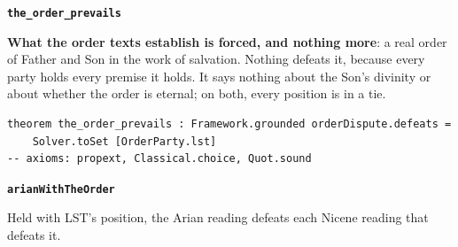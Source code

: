 \documentclass[11pt,paper=\testimonypaper,DIV=13,parskip=false]{scrartcl}
\begin{document}
\par\medskip\noindent\textbf{\texttt{the\_\allowbreak{}order\_\allowbreak{}prevails}}\par\nobreak\noindent
\textbf{What the order texts establish is forced, and nothing more}: a real order of Father and Son in the work of salvation. Nothing defeats it, because every party holds every premise it holds. It says nothing about the Son’s divinity or about whether the order is eternal; on both, every position is in a tie.

{\small\begin{verbatim}
theorem the_order_prevails : Framework.grounded orderDispute.defeats =
    Solver.toSet [OrderParty.lst]
-- axioms: propext, Classical.choice, Quot.sound
\end{verbatim}}
\par\medskip\noindent\textbf{\texttt{arian\allowbreak{}With\allowbreak{}The\allowbreak{}Order}}\par\nobreak\noindent
Held with LST’s position, the Arian reading defeats each Nicene reading that defeats it.
\end{document}
